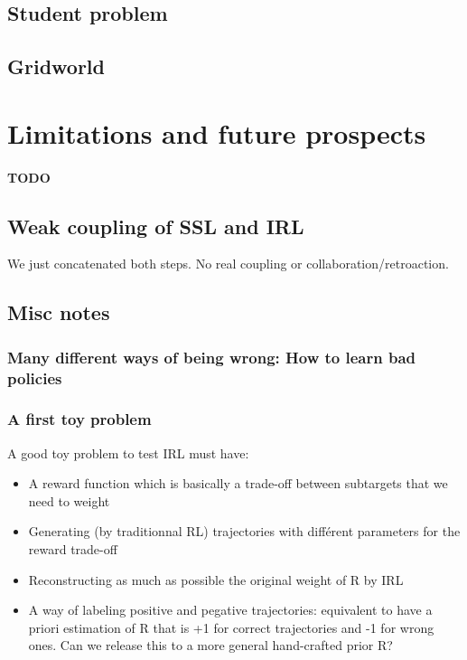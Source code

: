 \documentclass{article}
\begin{document}
\subsection{Student problem}

\subsection{Gridworld}



\section{Limitations and future prospects \label{sec:limitations}}

\paragraph{TODO}

\subsection{Weak coupling of SSL and IRL}

We just concatenated both steps. No real coupling or collaboration/retroaction.

\subsection{Misc notes}

\subsubsection{Many different ways of being wrong: How to learn bad policies}

\subsubsection{A first toy problem}

A good toy problem to test IRL must have:

\begin{itemize}
    \item A reward function which is basically a trade-off between subtargets that we need to weight
    \item Generating (by traditionnal RL) trajectories with différent parameters for the reward trade-off
    \item Reconstructing as much as possible the original weight of R by IRL
    \item A way of labeling positive and pegative trajectories: equivalent to have a priori estimation of R that is +1 for correct trajectories and -1 for wrong ones. Can we release this to a more general hand-crafted prior R?
\end{itemize}
\end{document}
